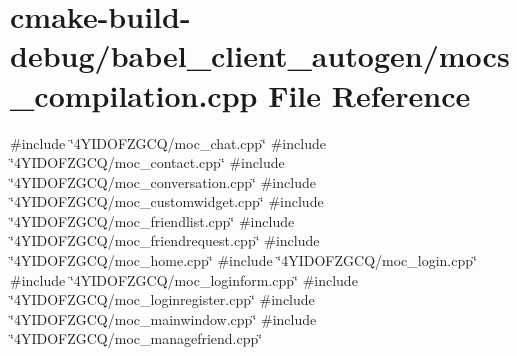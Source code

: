 \hypertarget{cmake-build-debug_2babel__client__autogen_2mocs__compilation_8cpp}{}\section{cmake-\/build-\/debug/babel\+\_\+client\+\_\+autogen/mocs\+\_\+compilation.cpp File Reference}
\label{cmake-build-debug_2babel__client__autogen_2mocs__compilation_8cpp}
{\ttfamily \#include \char`\"{}4\+Y\+I\+D\+O\+F\+Z\+G\+C\+Q/moc\+\_\+chat.\+cpp\char`\"{}}\newline
{\ttfamily \#include \char`\"{}4\+Y\+I\+D\+O\+F\+Z\+G\+C\+Q/moc\+\_\+contact.\+cpp\char`\"{}}\newline
{\ttfamily \#include \char`\"{}4\+Y\+I\+D\+O\+F\+Z\+G\+C\+Q/moc\+\_\+conversation.\+cpp\char`\"{}}\newline
{\ttfamily \#include \char`\"{}4\+Y\+I\+D\+O\+F\+Z\+G\+C\+Q/moc\+\_\+customwidget.\+cpp\char`\"{}}\newline
{\ttfamily \#include \char`\"{}4\+Y\+I\+D\+O\+F\+Z\+G\+C\+Q/moc\+\_\+friendlist.\+cpp\char`\"{}}\newline
{\ttfamily \#include \char`\"{}4\+Y\+I\+D\+O\+F\+Z\+G\+C\+Q/moc\+\_\+friendrequest.\+cpp\char`\"{}}\newline
{\ttfamily \#include \char`\"{}4\+Y\+I\+D\+O\+F\+Z\+G\+C\+Q/moc\+\_\+home.\+cpp\char`\"{}}\newline
{\ttfamily \#include \char`\"{}4\+Y\+I\+D\+O\+F\+Z\+G\+C\+Q/moc\+\_\+login.\+cpp\char`\"{}}\newline
{\ttfamily \#include \char`\"{}4\+Y\+I\+D\+O\+F\+Z\+G\+C\+Q/moc\+\_\+loginform.\+cpp\char`\"{}}\newline
{\ttfamily \#include \char`\"{}4\+Y\+I\+D\+O\+F\+Z\+G\+C\+Q/moc\+\_\+loginregister.\+cpp\char`\"{}}\newline
{\ttfamily \#include \char`\"{}4\+Y\+I\+D\+O\+F\+Z\+G\+C\+Q/moc\+\_\+mainwindow.\+cpp\char`\"{}}\newline
{\ttfamily \#include \char`\"{}4\+Y\+I\+D\+O\+F\+Z\+G\+C\+Q/moc\+\_\+managefriend.\+cpp\char`\"{}}\newline
